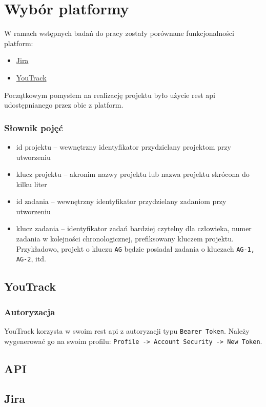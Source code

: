 \section{Wybór platformy}
W ramach wstępnych badań do pracy zostały porównane funkcjonalności platform:
\begin{itemize}
    \item \href{https://www.atlassian.com/software/jira}{Jira}
    \item \href{https://www.jetbrains.com/youtrack/}{YouTrack}
\end{itemize}
Początkowym pomysłem na realizację projektu było użycie rest api udostępnianego przez obie z platform.

\subsubsection*{Słownik pojęć}
\begin{itemize}
    \item id projektu -- wewnętrzny identyfikator przydzielany projektom przy utworzeniu
    \item klucz projektu -- akronim nazwy projektu lub nazwa projektu skrócona do kilku liter
    \item id zadania -- wewnętrzny identyfikator przydzielany zadaniom przy utworzeniu
    \item klucz zadania -- identyfikator zadań bardziej czytelny dla człowieka, numer zadania w kolejności chronologicznej, prefiksowany kluczem projektu.
    Przykładowo, projekt o kluczu \texttt{AG} będzie posiadał zadania o kluczach \texttt{AG-1, AG-2}, itd.
\end{itemize}

\subsection*{YouTrack}
\subsubsection*{Autoryzacja}
YouTrack korzysta w swoim rest api z autoryzacji typu \texttt{Bearer Token}.
Należy wygenerować go na swoim profilu: \texttt{Profile -> Account Security -> New Token}.
\subsection*{API}

\subsection*{Jira}
